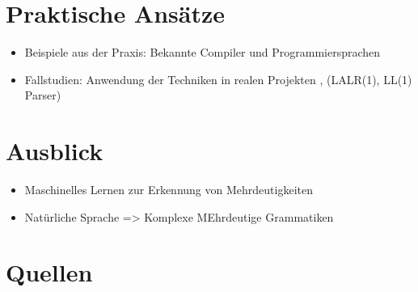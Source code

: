\documentclass[t]{beamer}
\begin{document}
	\section{Praktische Ansätze}\label{sec:praktische-ansatze}
	\begin{frame}
		\begin{itemize}
			\item Beispiele aus der Praxis: Bekannte Compiler und Programmiersprachen
			\item Fallstudien: Anwendung der Techniken in realen Projekten , (LALR(1), LL(1) Parser)
		\end{itemize}
	\end{frame}


	\section{Ausblick}\label{sec:ausblick-und-zukunftige-projekte}
	\begin{frame}
		\begin{itemize}
			\item Maschinelles Lernen zur Erkennung von Mehrdeutigkeiten
			\item Natürliche Sprache => Komplexe MEhrdeutige Grammatiken
		\end{itemize}
	\end{frame}


	\section{Quellen}\label{sec:quellen}
	\begin{frame}[allowframebreaks]
		
		
	\end{frame}
\end{document}
